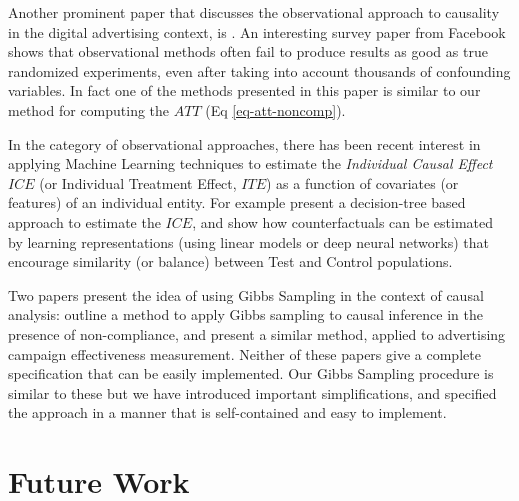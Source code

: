 \documentclass[11pt,a4paper]{article}
\theoremstyle{definition}
\theoremstyle{remark}
\theoremstyle{definition}
\theoremstyle{definition}
\theoremstyle{definition}
\theoremstyle{definition}
\theoremstyle{definition}
\theoremstyle{definition}
\begin{document}

Another prominent paper that discusses the observational approach to causality in the digital advertising context, is \cite{chan2010evaluating}. An interesting survey paper from Facebook \cite{gordon2016comparison} shows that observational methods often fail to produce results as good as true randomized experiments, even after taking into account thousands of confounding variables. In fact one of the methods presented in this paper is similar to our method for computing the $ATT$ (Eq \ref{eq-att-noncomp}). 

In the category of observational approaches, there has been recent interest in applying Machine Learning techniques to estimate the \textit{Individual Causal Effect} $ICE$ (or Individual Treatment Effect, $ITE$) as a function of covariates (or features) of an individual entity. For example \cite{athey2016recursive, Athey2015} present a decision-tree based approach to estimate the $ICE$, and \cite{johansson2016learning} show how counterfactuals can be estimated by learning representations (using linear models or deep neural networks) that encourage similarity (or balance) between Test and Control populations.



Two papers present the idea of using Gibbs Sampling in the context of causal analysis: \cite{Chickering1996} outline a method to apply Gibbs sampling to causal inference in the presence of non-compliance, and \cite{Barajas2012} present a similar method, applied to advertising campaign effectiveness measurement. Neither of these papers give a complete specification that can be easily implemented. Our Gibbs Sampling procedure is similar to these but we have introduced important simplifications, and specified the approach in a manner that is self-contained and easy to implement.

\section{Future Work}\label{sec-future}
\end{document}
